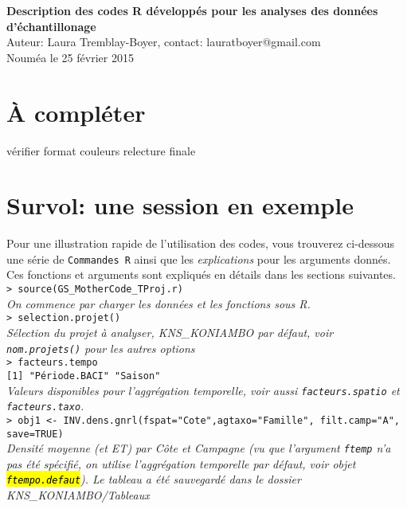 \documentclass{article}
\begin{document}
{\Large \textbf{Description des codes R développés pour les analyses
    des données d'échantillonage}}\\
Auteur: Laura Tremblay-Boyer, contact: lauratboyer@gmail.com\\
Nouméa le 25 février 2015\\

\section{À compléter}

vérifier format couleurs
relecture finale

\clearpage
\tableofcontents

\section{Survol: une session en exemple}
Pour une illustration rapide de l'utilisation des codes, vous
trouverez ci-dessous une série de \texttt{Commandes R} ainsi que les
\emph{explications} pour les arguments donnés. Ces fonctions et
arguments sont expliqués en détails dans les sections suivantes.\\

\texttt{> source(GS\_MotherCode\_TProj.r)} \\
\emph{On commence par charger les données et les fonctions sous R.}\\

\texttt{> selection.projet()}\\
\emph{Sélection du projet à analyser, KNS\_KONIAMBO par défaut, voir
  \texttt{nom.projets()} pour les autres options}\\

\texttt{> facteurs.tempo}\\
\texttt{[1] "Période.BACI" "Saison"}\\
\emph{Valeurs disponibles pour l'aggrégation temporelle, voir aussi
  \texttt{facteurs.spatio} et \texttt{facteurs.taxo}.}\\


\texttt{> obj1 <- INV.dens.gnrl(fspat="Cote",agtaxo="Famille",
  filt.camp="A", save=TRUE)}\\
\emph{Densité moyenne (et ET) par Côte et Campagne (vu que l'argument
\texttt{ftemp} n'a pas été spécifié, on utilise l'aggrégation
temporelle par défaut, voir objet \hl{\texttt{ftempo.defaut}}). Le
tableau a été sauvegardé dans le dossier KNS\_KONIAMBO/Tableaux}\\
\end{document}
